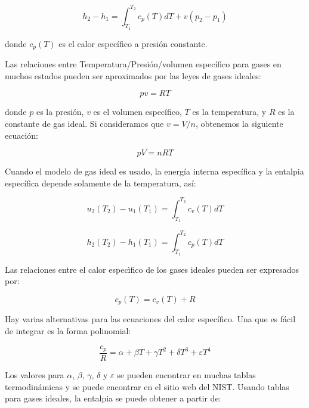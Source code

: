 \documentclass[12pt]{book}
\theoremstyle{definition}
\theoremstyle{remark}
\theoremstyle{plain}
\begin{document}
\begin{equation}
 \label{equ310}
h_2-h_1= \int_{T_1}^{T_2} c_p(T) dT +v(p_2-p_1)
\end{equation}

donde $c_p(T)$ es el calor específico a presión constante.

Las relaciones entre Temperatura/Presión/volumen específico para gases en muchos estados
pueden ser aproximados por las leyes de gases ideales:

\begin{equation}
 \label{equ311}
p v = R T
\end{equation}

donde $p$ es la presión, $v$ es el volumen específico, $T$ es la temperatura, y
$R$ es la constante de gas ideal. Si consideramos que $v=V/n$, obtenemos la siguiente
ecuación:

\begin{equation}
 \label{equ312}
p V = n R T
\end{equation}

Cuando el modelo de gas ideal es usado, la energía interna específica y la entalpia 
específica depende solamente de la temperatura, así:

\begin{equation}
 \label{equ313}
u_2(T_2)-u_1(T_1) = \int_{T_1}^{T_2} c_v(T) d T
\end{equation}

\begin{equation}
 \label{equ314}
h_2(T_2)-h_1(T_1) = \int_{T_1}^{T_2} c_p(T) d T
\end{equation}

Las relaciones entre el calor especìfico de los gases ideales pueden ser expresados
por:

\begin{equation}
 \label{equ315}
c_p(T) = c_v(T)+R
\end{equation}

Hay varias alternativas para las ecuaciones del calor específico. Una que es fácil
de integrar es la forma polinomial:

\begin{equation}
 \label{equ316}
\frac{c_p}{R}=\alpha + \beta T+ \gamma T^2+ \delta T^3+\varepsilon T^4
\end{equation}

Los valores para $\alpha$, $\beta$, $\gamma$, $\delta$ y $\varepsilon$ se pueden 
encontrar en muchas tablas termodinámicas y se puede encontrar en el sitio web del NIST. Usando
tablas para gases ideales, la entalpia se puede obtener a partir de:
\end{document}
